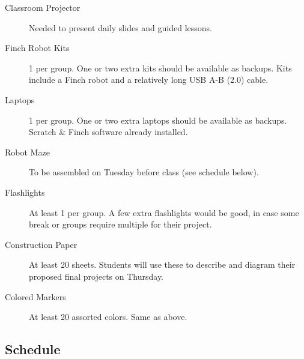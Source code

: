 \documentclass[a4paper]{article}
\begin{document}
		\begin{description}
			\item[Classroom Projector] Needed to present daily slides and guided lessons.
			
			\item[Finch Robot Kits] 1 per group. One or two extra kits should be available as backups. Kits include a Finch robot and a relatively long USB A-B (2.0) cable.
			
			\item[Laptops] 1 per group. One or two extra laptops should be available as backups. Scratch \& Finch software already installed.
			
			\item[Robot Maze] To be assembled on Tuesday before class (see schedule below).
			
			\item[Flashlights] At least 1 per group. A few extra flashlights would be good, in case some break or groups require multiple for their project.
			
			\item[Construction Paper] At least 20 sheets. Students will use these to describe and diagram their proposed final projects on Thursday.
			
			\item[Colored Markers] At least 20 assorted colors. Same as above.
		\end{description}
	
	\newpage
	
	\subsection{Schedule}
	
\end{document}
